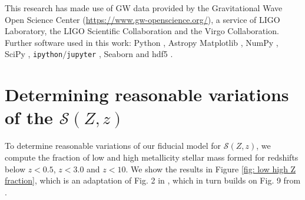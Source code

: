 \documentclass[linenumbers,twocolumn]{aastex631}
\newcommand{\SFRDzZ}{\ensuremath{\mathcal{S}(Z,z)}\xspace}
\begin{document}
This research has made use of GW data provided by the Gravitational Wave Open Science Center (\url{https://www.gw-openscience.org/}), a service of LIGO Laboratory, the LIGO Scientific Collaboration and the Virgo Collaboration. 
Further software used in this work: Python \citep{PythonReferenceManual},  Astropy \citep{astropy:2013,astropy:2018} Matplotlib \citep{2007CSE.....9...90H},  {NumPy} \citep{2020NumPy-Array}, SciPy \citep{2020SciPy-NMeth}, \texttt{ipython$/$jupyter} \citep{2007CSE.....9c..21P, Kluyver2016jupyter},  Seaborn \citep{waskom2020seaborn}  and  {hdf5}   \citep{collette_python_hdf5_2019}. 


\appendix

\section{Determining reasonable variations of the \SFRDzZ \label{app: reasonable var}}
To determine reasonable variations of our fiducial model for \SFRDzZ, we compute the fraction of low and high metallicity stellar mass formed for redshifts below $z<0.5$, $z < 3.0$ and $z<10$. We show the results in Figure \ref{fig: low high Z fraction}, which is an adaptation of Fig. 2 in \cite{Pakmor+2022}, which in turn builds on Fig. 9 from \cite{Chruslinska2019_obs}.
\end{document}
